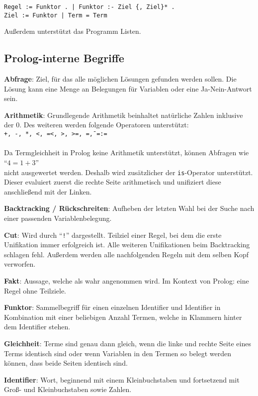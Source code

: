 \documentclass[parskip=full,11pt,twoside]{scrartcl}
\begin{document}
\begin{lstlisting}
Regel := Funktor . | Funktor :- Ziel {, Ziel}* .
Ziel := Funktor | Term = Term
\end{lstlisting}

Außerdem unterstützt das Programm Listen.

\subsection{Prolog-interne Begriffe}
\textbf{Abfrage}:
Ziel, für das alle möglichen Lösungen gefunden werden sollen. Die Lösung kann eine Menge an Belegungen für Variablen oder eine Ja-Nein-Antwort sein.

\textbf{Arithmetik}:
Grundlegende Arithmetik beinhaltet natürliche Zahlen inklusive der 0. Des weiteren werden folgende Operatoren unterstützt:\\
\texttt{+, -, *, <, =<, >, >=, =\=, =:=}\\
\\
Da Termgleichheit in Prolog keine Arithmetik unterstützt, können Abfragen wie\\
\enquote{$4 = 1 + 3$}\\
nicht ausgewertet werden. Deshalb wird zusätzlicher der \texttt{is}-Operator unterstützt. Dieser evaluiert zuerst die rechte Seite arithmetisch und unifiziert diese anschließend mit der Linken.

\textbf{Backtracking / Rückschreiten}:
Aufheben der letzten Wahl bei der Suche nach einer passenden Variablenbelegung.

\textbf{Cut}:
Wird durch \enquote{\texttt{!}} dargestellt. Teilziel einer Regel, bei dem die erste Unifikation immer erfolgreich ist. Alle weiteren Unifikationen beim Backtracking schlagen fehl. Außerdem werden alle nachfolgenden Regeln mit dem selben Kopf verworfen.

\textbf{Fakt}:
Aussage, welche als wahr angenommen wird. Im Kontext von Prolog: eine Regel ohne Teilziele.

\textbf{Funktor}:
Sammelbegriff für einen einzelnen Identifier und Identifier in Kombination mit einer beliebigen Anzahl Termen, welche in Klammern hinter dem Identifier stehen.

\textbf{Gleichheit}:
Terme sind genau dann gleich, wenn die linke und rechte Seite eines Terms identisch sind oder wenn Variablen in den Termen so belegt werden können, dass beide Seiten identisch sind.

\textbf{Identifier}:
Wort, beginnend mit einem Kleinbuchstaben und fortsetzend mit Groß- und Kleinbuchstaben sowie Zahlen.
\end{document}
